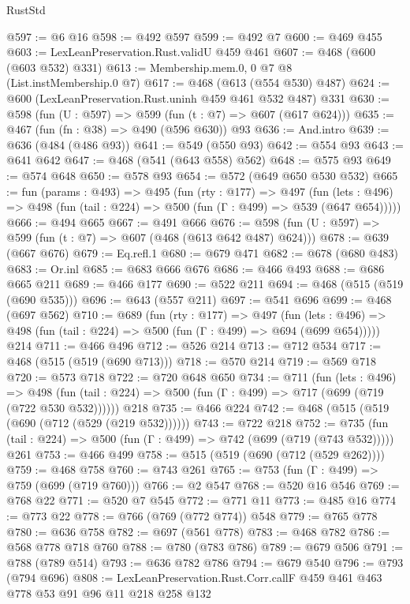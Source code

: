 \begin{lexlean}{RustStd}
\begin{coremodule}
@597 := @6 @16
@598 := @492 @597
@599 := @492 @7
@600 := @469 @455
@603 := LexLeanPreservation.Rust.validU @459 @461
@607 := @468 (@600 (@603 @532) @331)
@613 := Membership.mem.{0, 0} @7 @8 (List.instMembership.{0} @7)
@617 := @468 (@613 (@554 @530) @487)
@624 := @600 (LexLeanPreservation.Rust.uninh @459 @461 @532 @487) @331
@630 := @598 (fun (U : @597) => @599 (fun (t : @7) => @607 (@617 @624)))
@635 := @467 (fun (fn : @38) => @490 (@596 @630)) @93
@636 := And.intro
@639 := @636 (@484 (@486 @93))
@641 := @549 (@550 @93)
@642 := @554 @93
@643 := @641 @642
@647 := @468 (@541 (@643 @558) @562)
@648 := @575 @93
@649 := @574 @648
@650 := @578 @93
@654 := @572 (@649 @650 @530 @532)
@665 := fun (params : @493) =>
  @495
    (fun (rty : @177) =>
    @497
      (fun (lets : @496) => @498 (fun (tail : @224) => @500 (fun (Γ : @499) => @539 (@647 @654)))))
@666 := @494 @665
@667 := @491 @666
@676 := @598 (fun (U : @597) => @599 (fun (t : @7) => @607 (@468 (@613 @642 @487) @624)))
@678 := @639 (@667 @676)
@679 := Eq.refl.{1}
@680 := @679 @471
@682 := @678 (@680 @483)
@683 := Or.inl
@685 := @683 @666 @676
@686 := @466 @493
@688 := @686 @665 @211
@689 := @466 @177
@690 := @522 @211
@694 := @468 (@515 (@519 (@690 @535)))
@696 := @643 (@557 @211)
@697 := @541 @696
@699 := @468 (@697 @562)
@710 := @689
    (fun (rty : @177) =>
    @497
      (fun (lets : @496) => @498 (fun (tail : @224) => @500 (fun (Γ : @499) => @694 (@699 @654)))))
    @214
@711 := @466 @496
@712 := @526 @214
@713 := @712 @534
@717 := @468 (@515 (@519 (@690 @713)))
@718 := @570 @214
@719 := @569 @718
@720 := @573 @718
@722 := @720 @648 @650
@734 := @711
    (fun (lets : @496) =>
    @498 (fun (tail : @224) => @500 (fun (Γ : @499) => @717 (@699 (@719 (@722 @530 @532))))))
    @218
@735 := @466 @224
@742 := @468 (@515 (@519 (@690 (@712 (@529 (@219 @532))))))
@743 := @722 @218
@752 := @735 (fun (tail : @224) => @500 (fun (Γ : @499) => @742 (@699 (@719 (@743 @532))))) @261
@753 := @466 @499
@758 := @515 (@519 (@690 (@712 (@529 @262))))
@759 := @468 @758
@760 := @743 @261
@765 := @753 (fun (Γ : @499) => @759 (@699 (@719 @760)))
@766 := @2 @547
@768 := @520 @16 @546
@769 := @768 @22
@771 := @520 @7 @545
@772 := @771 @11
@773 := @485 @16
@774 := @773 @22
@778 := @766 (@769 (@772 @774)) @548
@779 := @765 @778
@780 := @636 @758
@782 := @697 (@561 @778)
@783 := @468 @782
@786 := @568 @778 @718 @760
@788 := @780 (@783 @786)
@789 := @679 @506
@791 := @788 (@789 @514)
@793 := @636 @782 @786
@794 := @679 @540
@796 := @793 (@794 @696)
@808 := LexLeanPreservation.Rust.Corr.callF @459 @461 @463 @778 @53 @91 @96 @11 @218 @258 @132

\end{coremodule}
\end{lexlean}
